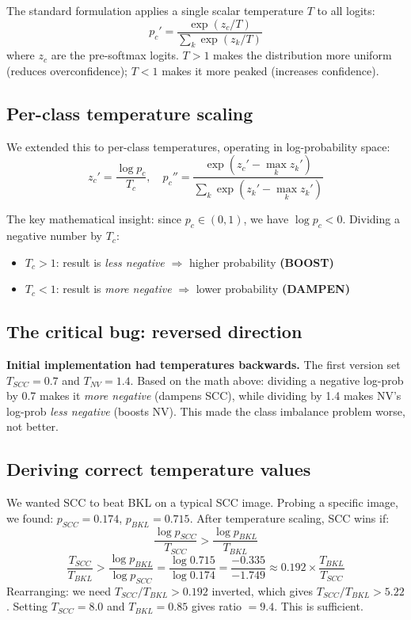 \documentclass[12pt,a4paper]{article}
\begin{document}
The standard formulation applies a single scalar temperature $T$ to all logits:
\[
p_c' = \frac{\exp(z_c / T)}{\sum_{k} \exp(z_k / T)}
\]
where $z_c$ are the pre-softmax logits. $T > 1$ makes the distribution more uniform (reduces
overconfidence); $T < 1$ makes it more peaked (increases confidence).

\subsection{Per-class temperature scaling}

We extended this to per-class temperatures, operating in log-probability space:
\[
z_c' = \frac{\log p_c}{T_c}, \quad p_c'' = \frac{\exp(z_c' - \max_k z_k')}{\sum_k \exp(z_k' - \max_k z_k')}
\]

The key mathematical insight: since $p_c \in (0,1)$, we have $\log p_c < 0$. Dividing a
negative number by $T_c$:
\begin{itemize}
  \item $T_c > 1$: result is \emph{less negative} $\Rightarrow$ higher probability \textbf{(BOOST)}
  \item $T_c < 1$: result is \emph{more negative} $\Rightarrow$ lower probability \textbf{(DAMPEN)}
\end{itemize}

\subsection{The critical bug: reversed direction}

\begin{gotcha}
\textbf{Initial implementation had temperatures backwards.} The first version set $T_{SCC} = 0.7$
and $T_{NV} = 1.4$. Based on the math above: dividing a negative log-prob by 0.7 makes it
\emph{more negative} (dampens SCC), while dividing by 1.4 makes NV's log-prob \emph{less negative}
(boosts NV). This made the class imbalance problem worse, not better.
\end{gotcha}

\subsection{Deriving correct temperature values}

We wanted SCC to beat BKL on a typical SCC image. Probing a specific image, we found:
$p_{SCC} = 0.174$, $p_{BKL} = 0.715$. After temperature scaling, SCC wins if:
\[
\frac{\log p_{SCC}}{T_{SCC}} > \frac{\log p_{BKL}}{T_{BKL}}
\]
\[
\frac{T_{SCC}}{T_{BKL}} > \frac{\log p_{BKL}}{\log p_{SCC}} = \frac{\log 0.715}{\log 0.174} = \frac{-0.335}{-1.749} \approx 0.192 \times \frac{T_{BKL}}{T_{SCC}}
\]
Rearranging: we need $T_{SCC} / T_{BKL} > 0.192$ inverted, which gives $T_{SCC}/T_{BKL} > 5.22$.
Setting $T_{SCC} = 8.0$ and $T_{BKL} = 0.85$ gives ratio $= 9.4$. This is sufficient.
\end{document}
